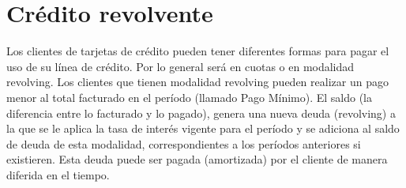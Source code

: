 \section{Crédito revolvente}

Los clientes de tarjetas de crédito pueden tener diferentes formas para pagar el uso de su línea de crédito. Por lo general será en cuotas o en modalidad revolving. Los clientes que tienen modalidad revolving pueden realizar un pago menor al total facturado en el período (llamado Pago Mínimo). El saldo (la diferencia entre lo facturado y lo pagado), genera una nueva deuda (revolving) a la que se le aplica la tasa de interés vigente para el período y se adiciona al saldo de deuda de esta modalidad, correspondientes a los períodos anteriores si existieren. Esta deuda puede ser pagada (amortizada) por el cliente de manera diferida en el tiempo.\cite{banco1991informe}
